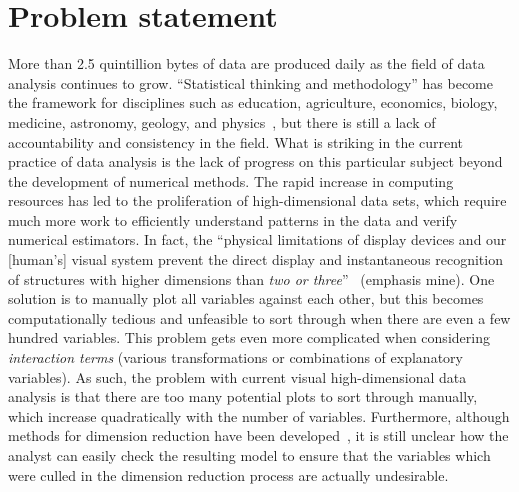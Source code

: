 \section{Problem statement}
\label{sec:intro:problem}

More than 2.5 quintillion bytes of data are produced daily as the field of data
analysis continues to grow. ``Statistical thinking and methodology'' has become
the framework for disciplines such as education, agriculture, economics,
biology, medicine, astronomy, geology, and physics~\cite{efron1986}, but there
is still a lack of accountability and consistency in the field. What is striking
in the current practice of data analysis is the lack of progress on this
particular subject beyond the development of numerical methods. The rapid
increase in computing resources has led to the proliferation of high-dimensional
data sets, which require much more work to efficiently understand patterns in 
the data and verify numerical estimators. In fact, the ``physical limitations 
of display devices and our [human's] visual system prevent the direct display 
and instantaneous recognition of structures with higher dimensions than 
\textit{two or three}''~\cite{lius2016} (emphasis mine). 
One solution is to manually plot all variables against each other, but this 
becomes computationally tedious and unfeasible to sort through when there are 
even a few hundred variables. This problem gets even more complicated when 
considering \textit{interaction terms} (various transformations or combinations 
of explanatory variables). As such, the problem with current visual 
high-dimensional data analysis is that there are too many
potential plots to sort through manually, which increase quadratically with the 
number of variables. Furthermore, although methods for dimension reduction have 
been developed~\cite{lius2016}, it is still unclear how the analyst can easily 
check the resulting model to ensure that the variables which were culled in the 
dimension reduction process are actually undesirable.

